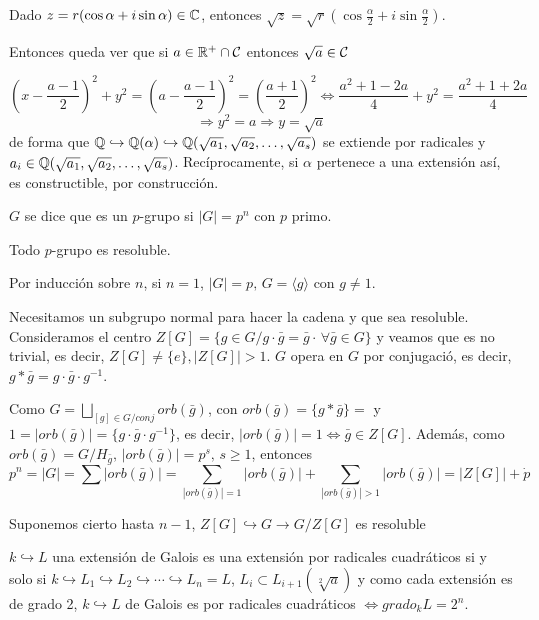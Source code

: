 Dado $z = r(\cos\alpha+i \sin\alpha) \in \mathbb{C}$, entonces $\sqrt{z} = \sqrt{r} (\cos \frac{\alpha}{2} + i \sin \frac{\alpha}{2})$. \begin{prop} Entonces queda ver que si $a\in \mathbb{R}^+ \cap \mathcal{C}$ entonces $\sqrt{a} \in \mathcal{C}$
\end{prop}
\begin{dem}
    $$\left(x-\frac{a-1}{2}\right)^2  + y^2= \left(a-\frac{a-1}{2}\right)^2 = \left(\frac{a+1}{2}\right)^2 \iff \frac{a^2+1-2a}{4} + y^2 = \frac{a^2+1+2a}{4} $$ 
    $$\Rightarrow y^2=a \Rightarrow y = \sqrt{a} $$
    de forma que $\mathbb{Q} \hookrightarrow \mathbb{Q}(\alpha) \hookrightarrow \mathbb{Q}(\sqrt{a_1}, \sqrt{a_2}, \ldots, \sqrt{a_s})$ se extiende por radicales y $a_i \in \mathbb{Q}(\sqrt{a_1}, \sqrt{a_2}, \ldots, \sqrt{a_s})$. Rec\'iprocamente, si $\alpha$ pertenece a una extensi\'on as\'i, es constructible, por construcci\'on. 
\end{dem}
\begin{defi}
    $G$ se dice que es un $p$-grupo si $|G| = p^n$ con $p$ primo.
\end{defi}
\begin{teo}
    Todo $p$-grupo es resoluble.
\end{teo}
\begin{dem}
    Por inducci\'on sobre $n$, si $n=1$, $|G|=p, \, G = \langle g \rangle$ con $g\neq 1$. 

    Necesitamos un subgrupo normal para hacer la cadena y que sea resoluble. Consideramos el centro $Z[G]=\{g\in G / g\cdot \bar g = \bar g \cdot \, \forall \bar g \in G\}$ y veamos que es no trivial, es decir, $Z[G] \neq \{e\}, |Z[G]| >1$. $G$ opera en $G$ por conjugaci\'o, es decir, $g*\bar g = g\cdot \bar g \cdot g^{-1}$. 

    Como $G = \bigsqcup_{[g]\in G/conj} orb(\bar g)$, con $orb(\bar g)=\{g*\bar g\} = $
    y $1 = |orb(\bar g)| = \{ g\cdot \bar g \cdot g^{-1}\}$, es decir, $| orb(\bar g)| = 1\iff \bar g \in Z[G]$. Adem\'as, como $orb(\bar g) = G/H_{\bar g}, \, |orb(\bar g)|=p^s, \, s\ge 1$, entonces 
    $$p^n =  |G|=\sum |orb(\bar g)| = \sum_{|orb(\bar g)| =1} |orb(\bar g)| +\sum_{|orb(\bar g)| >1} |orb(\bar g)| = |Z[G]| + \dot{p} $$

    Suponemos cierto hasta $n-1$, $Z[G] \hookrightarrow G \longrightarrow G/Z[G]$ es resoluble
 \end{dem}
 \begin{cor}
    $k \hookrightarrow L$ una extensi\'on de Galois es una extensi\'on por radicales cuadr\'aticos si y solo si $k \hookrightarrow L_1 \hookrightarrow L_2 \hookrightarrow \cdots \hookrightarrow L_n = L$, $L_i \subset L_{i+1}(\sqrt[2]{a})$ y como cada extensi\'on es de grado 2, $k\hookrightarrow L$ de Galois es por radicales cuadr\'aticos $\iff grado_k L = 2^n$. 
 \end{cor}
